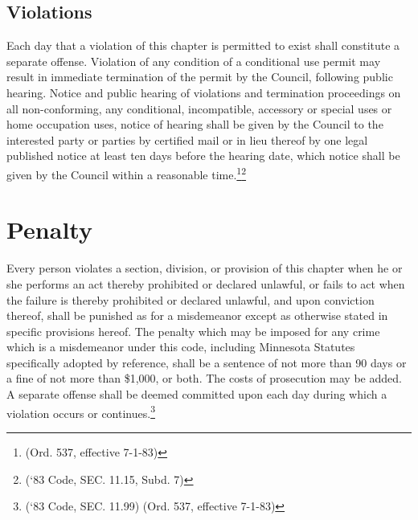 \subsection{Violations} Each day that a violation of this chapter is permitted to exist shall constitute a separate offense. Violation of any condition of a conditional use permit may result in immediate termination of the permit by the Council, following public hearing. Notice and public hearing of violations and termination proceedings on all non-conforming, any conditional, incompatible, accessory or special uses or home occupation uses, notice of hearing shall be given by the Council to the interested party or parties by certified mail or in lieu thereof by one legal published notice at least ten days before the hearing date, which notice shall be given by the Council within a reasonable time.\footnote{(Ord. 537, effective 7-1-83)}\footnote{(‘83 Code, SEC. 11.15, Subd. 7)}

\setcounter{section}{998}
\section{Penalty}
Every person violates a section, division, or provision of this chapter when he or she performs an act thereby prohibited or declared unlawful, or fails to act when the failure is thereby prohibited or declared unlawful, and upon conviction thereof, shall be punished as for a misdemeanor except as otherwise stated in specific provisions hereof. The penalty which may be imposed for any crime which is a misdemeanor under this code, including Minnesota Statutes specifically adopted by reference, shall be a sentence of not more than 90 days or a fine of not more than \$1,000, or both.  The costs of prosecution may be added. A separate offense shall be deemed committed upon each day during which a violation occurs or continues.\footnote{(‘83 Code, SEC. 11.99)  (Ord. 537, effective 7-1-83)}


